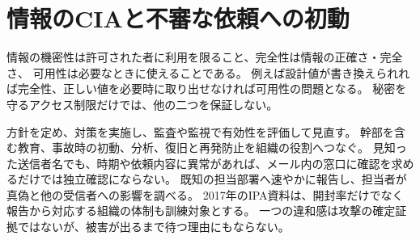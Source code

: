 \section{情報のCIAと不審な依頼への初動}
\label{theory:research:security}
情報の機密性は許可された者に利用を限ること、完全性は情報の正確さ・完全さ、
可用性は必要なときに使えることである。
例えば設計値が書き換えられれば完全性、正しい値を必要時に取り出せなければ可用性の問題となる。
秘密を守るアクセス制限だけでは、他の二つを保証しない。\cite{saf53_ipa_cia}

方針を定め、対策を実施し、監査や監視で有効性を評価して見直す。
幹部を含む教育、事故時の初動、分析、復旧と再発防止を組織の役割へつなぐ。
見知った送信者名でも、時期や依頼内容に異常があれば、メール内の窓口に確認を求めるだけでは独立確認にならない。
既知の担当部署へ速やかに報告し、担当者が真偽と他の受信者への影響を調べる。
2017年のIPA資料は、開封率だけでなく報告から対応する組織の体制も訓練対象とする。\cite{saf53_ipa_mail}
一つの違和感は攻撃の確定証拠ではないが、被害が出るまで待つ理由にもならない。
